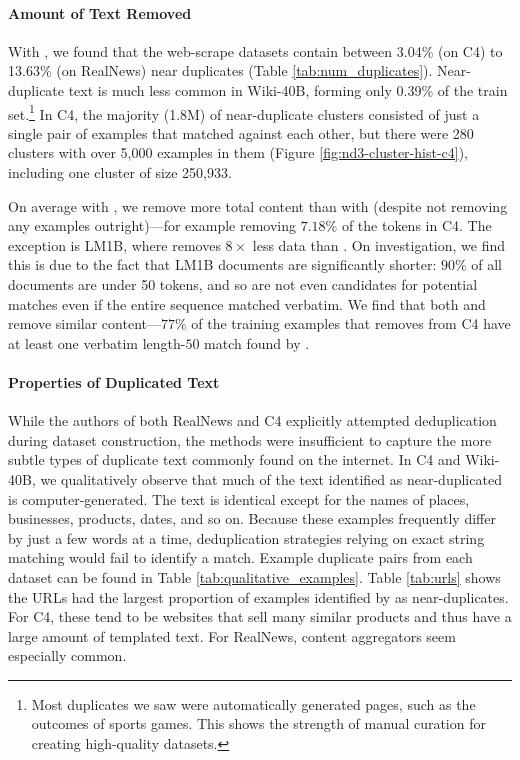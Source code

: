 \paragraph{Amount of Text Removed}
With \Approx{}, we found that the web-scrape datasets contain between 3.04\% (on C4) to 13.63\% (on RealNews) near duplicates (Table \ref{tab:num_duplicates}).
Near-duplicate text is much less common in Wiki-40B, forming only 0.39\% of the train set.\footnote{Most duplicates we saw were automatically generated pages, such as the outcomes of sports games.
This shows the strength of manual curation for creating high-quality datasets.}
In C4, the majority (1.8M) of near-duplicate clusters consisted of just a single pair of examples that matched against each other, but there were 280 clusters with over 5,000 examples in them (Figure \ref{fig:nd3-cluster-hist-c4}), including one cluster of size 250,933.

On average with \Exact{}, we remove more total content than with \Approx{} (despite \Exact{} not removing any examples outright)---for example removing $7.18\%$ of the tokens in C4.
%
The exception is LM1B, where \Exact{} removes $8\times$ less data than
\Approx{}.
On investigation, we find this is due to the fact that LM1B documents are significantly shorter: $90\%$ of all documents are under 50 tokens, and so are not even candidates for potential matches even if the entire sequence matched verbatim.
%
We find that both \Approx{} and \Exact{} remove similar content---$77\%$ of the training examples that \Approx{} removes from C4 have at least one verbatim length-$50$ match found by \Exact{}.





\paragraph{Properties of Duplicated Text}
While the authors of both RealNews and C4 explicitly attempted deduplication during dataset construction, the methods were insufficient to capture the more subtle types of duplicate text commonly found on the internet.
In C4 and Wiki-40B, we qualitatively observe that much of the text identified as near-duplicated is computer-generated.
The text is identical except for the names of places, businesses, products, dates, and so on. 
Because these examples frequently differ by just a few words at a time, deduplication strategies relying on exact string matching would fail to identify a match.
Example duplicate pairs from each dataset can be found in Table \ref{tab:qualitative_examples}.
Table \ref{tab:urls} shows the URLs had the largest proportion of examples identified by \Approx{} as near-duplicates. 
For C4, these tend to be websites that sell many similar products and thus have a large amount of templated text.
For RealNews, content aggregators seem especially common.

